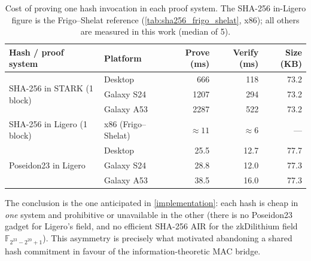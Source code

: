 \documentclass[binding=0.6cm,oneside,noexaminfo]{sapthesis}
\begin{document}
\begin{table}[ht]
  \centering
  \caption{Cost of proving one hash invocation in each proof system. The SHA-256
  in-Ligero figure is the Frigo--Shelat reference (\cref{tab:sha256_frigo_shelat},
  x86); all others are measured in this work (median of 5).}
  \label{tab:res-hash}
  \small
  \begin{tabular}{@{}llrrr@{}}
    \toprule
    \textbf{Hash / proof system} & \textbf{Platform} & \textbf{Prove (ms)} & \textbf{Verify (ms)} & \textbf{Size (KB)} \\
    \midrule
    \multirow{3}{*}{SHA-256 in STARK (1 block)}
        & Desktop    & 666  & 118 & 73.2 \\
        & Galaxy S24 & 1207 & 294 & 73.2 \\
        & Galaxy A53 & 2287 & 522 & 73.2 \\
    \midrule
    SHA-256 in Ligero (1 block) & x86 (Frigo--Shelat) & \multicolumn{1}{r}{$\approx 11$} & \multicolumn{1}{r}{$\approx 6$} & --- \\
    \midrule
    \multirow{3}{*}{Poseidon23 in Ligero}
        & Desktop    & 25.5 & 12.7 & 77.7 \\
        & Galaxy S24 & 28.8 & 12.0 & 77.3 \\
        & Galaxy A53 & 38.5 & 16.0 & 77.3 \\
    \bottomrule
  \end{tabular}
\end{table}

The conclusion is the one anticipated in \cref{implementation}: each hash is
cheap in \emph{one} system and prohibitive or unavailable in the other (there is
no Poseidon23 gadget for Ligero's field, and no efficient SHA-256 AIR for the
zkDilithium field $\mathbb{F}_{2^{23}-2^{20}+1}$). This asymmetry is precisely
what motivated abandoning a shared hash commitment in favour of the
information-theoretic MAC bridge.

\end{document}
